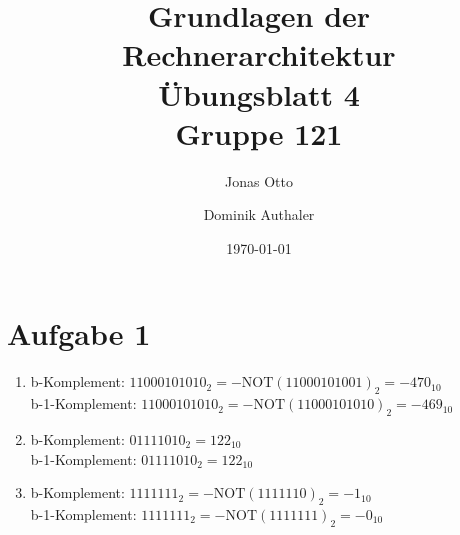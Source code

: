 \documentclass[a4paper]{article}
\title{Grundlagen der Rechnerarchitektur\\ Übungsblatt 4\\Gruppe 121\\}
\author{Jonas Otto\and Dominik Authaler}
\date{\today}
\begin{document}
\maketitle

\section{Aufgabe 1}
\begin{enumerate}[label=\alph*)]
\item b-Komplement: $11000101010_2 = -\text{NOT}(11000101001)_2 = -470_{10}$ \\
      b-1-Komplement: $11000101010_2 = -\text{NOT}(11000101010)_2 = -469_{10}$
\item b-Komplement: $01111010_2 = 122_{10}$ \\
      b-1-Komplement: $01111010_2 = 122_{10}$
\item b-Komplement: $1111111_2 = -\text{NOT}(1111110)_2 = -1_{10}$ \\
      b-1-Komplement: $1111111_2 = -\text{NOT}(1111111)_2 = -0_{10}$
\end{enumerate}
\end{document}
